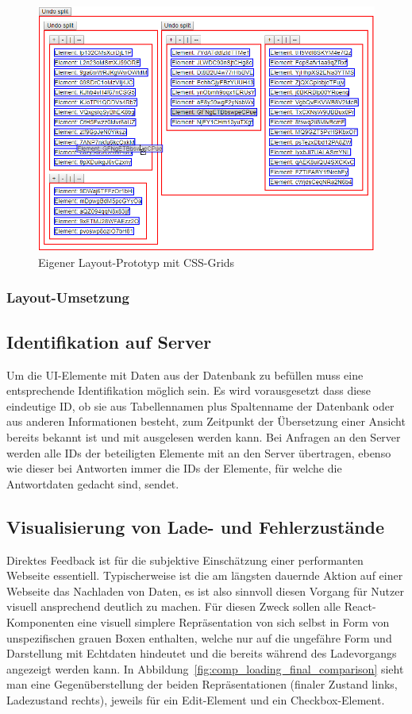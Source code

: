 \begin{figure}
    \centering
    \captionsetup{justification=centering}
    \includegraphics[width=\textwidth]{figures/layout_grid_test.png}
        \caption{Eigener Layout-Prototyp mit CSS-Grids}\label{fig:layout_grid_test}
\end{figure}

\subsubsection{Layout-Umsetzung}

\subsection{Identifikation auf Server}
Um die UI-Elemente mit Daten aus der Datenbank zu befüllen muss eine entsprechende Identifikation möglich sein. Es wird vorausgesetzt dass diese eindeutige ID, ob sie aus Tabellennamen plus Spaltenname der Datenbank oder aus anderen Informationen besteht, zum Zeitpunkt der Übersetzung einer Ansicht bereits bekannt ist und mit ausgelesen werden kann. Bei Anfragen an den Server werden alle IDs der beteiligten Elemente mit an den Server übertragen, ebenso wie dieser bei Antworten immer die IDs der Elemente, für welche die Antwortdaten gedacht sind, sendet.

\subsection{Visualisierung von Lade- und Fehlerzustände}
Direktes Feedback ist für die subjektive Einschätzung einer performanten Webseite essentiell. Typischerweise ist die am längsten dauernde Aktion auf einer Webseite das Nachladen von Daten, es ist also sinnvoll diesen Vorgang für Nutzer visuell ansprechend deutlich zu machen. Für diesen Zweck sollen alle React-Komponenten eine visuell simplere Repräsentation von sich selbst in Form von unspezifischen grauen Boxen enthalten, welche nur auf die ungefähre Form und Darstellung mit Echtdaten hindeutet und die bereits während des Ladevorgangs angezeigt werden kann. In Abbildung~\ref{fig:comp_loading_final_comparison} sieht man eine Gegenüberstellung der beiden Repräsentationen (finaler Zustand links, Ladezustand rechts), jeweils für ein Edit-Element und ein Checkbox-Element.

